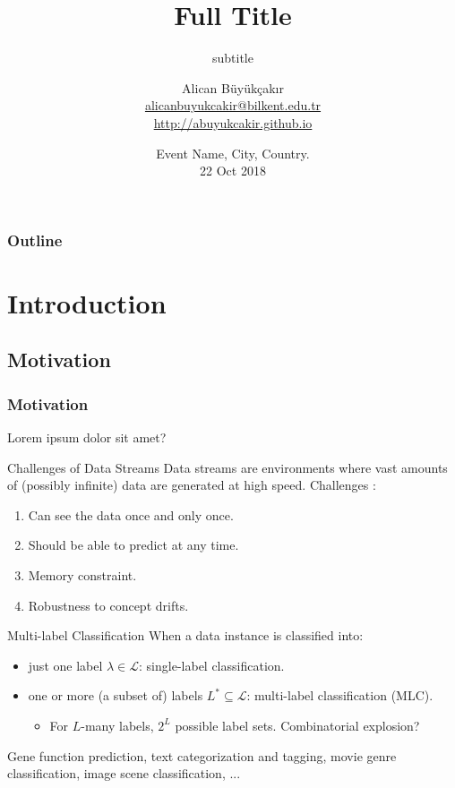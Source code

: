\documentclass{beamer}
\title[Bottom of the Slide Title]{Full Title}
\subtitle{subtitle}
\author[Alican Büyükçakır]{
  Alican Büyükçakır \\\medskip
  {\small \url{alicanbuyukcakir@bilkent.edu.tr}} \\ 
  {\small \url{http://abuyukcakir.github.io}}}
\institute[Bilkent University]{
  Bilkent Information Retrieval Group -- Computer Engineering Department \\
  Bilkent University}
\date[22 Oct 2018]{
  Event Name, City, Country. \\
  22 Oct 2018}
\begin{document}
\begin{frame}
  \titlepage
\end{frame}

\begin{frame}
  \frametitle{Outline}

  \tableofcontents
\end{frame}

\section{Introduction}

\subsection{Motivation}
\begin{frame}
  \frametitle{Motivation}
  Lorem ipsum dolor sit amet?
  
\end{frame}

\begin{frame}{Challenges of Data Streams}
    Data streams are environments where vast amounts of (possibly infinite) data are generated at high speed. Challenges \cite{bifet2009new}:
    \begin{enumerate}
        \item Can see the data once and only once.
        \item Should be able to predict at any time.
        \item Memory constraint.
        \item Robustness to concept drifts.
    \end{enumerate}
\end{frame}

\begin{frame}{Multi-label Classification}
  When a data instance is classified into:
  
  \begin{itemize}
    \item just one label $\lambda \in \mathcal{L}$: single-label classification.
    \item one or more (a subset of) labels $L^* \subseteq \mathcal{L}$: multi-label classification (MLC).
    \begin{itemize}
        \item For $L$-many labels, $2^L$ possible label sets. Combinatorial explosion?
    \end{itemize}
  \end{itemize}
  
  \begin{examples}
  Gene function prediction, text categorization and tagging, movie genre classification, image scene classification, ...
  \end{examples}
\end{frame}
\end{document}
